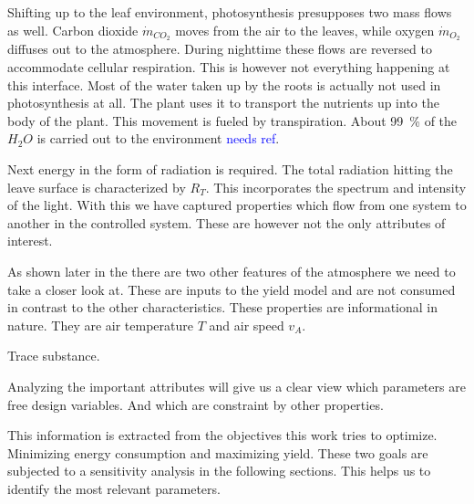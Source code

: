 Shifting up to the leaf environment, photosynthesis presupposes two mass flows as well.
Carbon dioxide $\dot{m}_{CO_2}$ moves from the air to the leaves, while oxygen $\dot{m}_{O_2}$ diffuses out to the atmosphere.
During nighttime these flows are reversed to accommodate cellular respiration.
This is however not everything happening at this interface.
Most of the water taken up by the roots is actually not used in photosynthesis at all.
The plant uses it to transport the nutrients up into the body of the plant.
This movement is fueled by transpiration.
About \SI{99}{\percent} of the $H_2O$ is carried out to the environment \textcolor{Blue}{needs ref}.

Next energy in the form of radiation is required.
The total radiation hitting the leave surface is characterized by $R_T$.
This incorporates the spectrum and intensity of the light.
With this we have captured properties which flow from one system to another in the controlled system.
These are however not the only attributes of interest.

As shown later in the  there are two other features of the atmosphere we need to take a closer look at.
These are inputs to the yield model and are not consumed in contrast to the other characteristics.
These properties are informational in nature.
They are air temperature $T$ and air speed $v_A$.

Trace substance.

Analyzing the important attributes will give us a clear view which parameters are free design variables.
And which are constraint by other properties.

This information is extracted from the objectives this work tries to optimize.
Minimizing energy consumption and maximizing yield.
These two goals are subjected to a sensitivity analysis in the following sections.
This helps us to identify the most relevant parameters.

